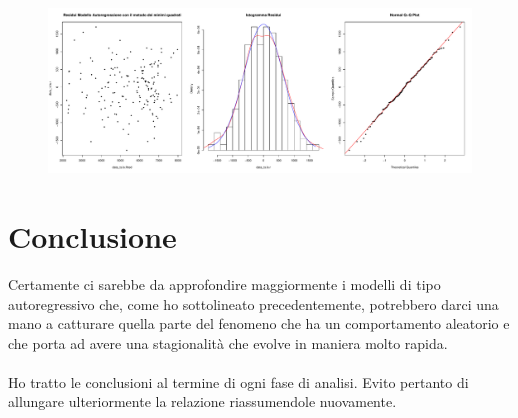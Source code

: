 \documentclass[11pt,a4paper]{article}
\begin{document}
\begin{figure}[H]
	\hspace{-2.5cm}
	\includegraphics[scale=0.51]{imgs/AR_residuals.pdf}
	\vspace{-1.0cm}
\end{figure}

\section{Conclusione}
Certamente ci sarebbe da approfondire maggiormente i modelli di tipo
autoregressivo che, come ho sottolineato precedentemente, potrebbero darci una
mano a catturare quella parte del fenomeno che ha un comportamento aleatorio e
che porta ad avere una stagionalit\`a che evolve in maniera molto rapida.\\
\\
Ho tratto le conclusioni al termine di ogni fase di analisi. Evito pertanto di
allungare ulteriormente la relazione riassumendole nuovamente.
\end{document}
